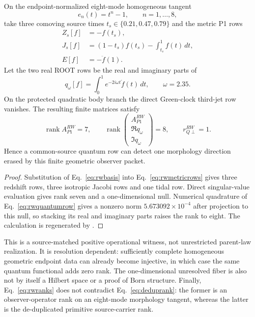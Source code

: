 \begin{proposition}
\label{prop:rwwitness}
On the endpoint-normalized eight-mode homogeneous tangent
\begin{equation}
e_n(t)=t^n-1,\qquad n=1,\ldots,8,
\label{eq:rwbasis}
\end{equation}
take three comoving source times
$t_s\in\{0.21,0.47,0.79\}$ and the metric P1 rows
\begin{align}
Z_s[f]&=-f(t_s),\nonumber\\
J_s[f]&=(1-t_s)f(t_s)-\int_{t_s}^{1}f(t)\,dt,\nonumber\\
E[f]&=-\ddot f(1).
\label{eq:rwmetricrows}
\end{align}
Let the two real ROOT rows be the real and imaginary parts of
\begin{equation}
q_\omega[f]=\int_0^1 e^{-2i\omega t}\dot f(t)\,dt,
\qquad \omega=2.35.
\label{eq:rwquantumrow}
\end{equation}
On the protected quadratic body branch the direct Green-clock third-jet row
vanishes.  The resulting finite matrices satisfy
\begin{equation}
\operatorname{rank}A_{P1}^{RW}=7,
\qquad
\operatorname{rank}\begin{pmatrix}A_{P1}^{RW}\\
\Re q_\omega\\ \Im q_\omega\end{pmatrix}=8,
\qquad r_{Q\perp}^{RW}=1.
\label{eq:rwranks}
\end{equation}
Hence a common-source quantum row can detect one morphology direction erased
by this finite geometric observer packet.
\end{proposition}

\begin{proof}
Substitution of Eq.~\eqref{eq:rwbasis} into
Eq.~\eqref{eq:rwmetricrows} gives three redshift rows, three isotropic Jacobi
rows and one tidal row.  Direct singular-value evaluation gives rank seven
and a one-dimensional null.  Numerical quadrature of
Eq.~\eqref{eq:rwquantumrow} gives a nonzero norm
$5.673092\times10^{-4}$ after projection to this null, so stacking its real
and imaginary parts raises the rank to eight.  The calculation is regenerated
by .
\end{proof}

This is a source-matched positive operational witness, not unrestricted
parent-law realization.  It is resolution dependent: sufficiently complete homogeneous
geometric endpoint data can already become injective, in which case the same
quantum functional adds zero rank.  The one-dimensional unresolved fiber is
also not by itself a Hilbert space or a proof of Born structure.  Finally,
Eq.~\eqref{eq:rwranks} does not contradict Eq.~\eqref{eq:deduprank}: the
former is an observer-operator rank on an eight-mode morphology tangent,
whereas the latter is the de-duplicated primitive source-carrier rank.

